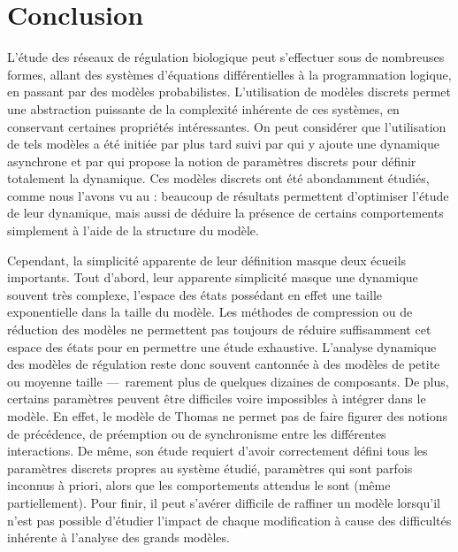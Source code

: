 
\chapter{Conclusion}




L'étude des réseaux de régulation biologique peut s'effectuer sous de nombreuses formes,
allant des systèmes d'équations différentielles à la programmation logique,
en passant par des modèles probabilistes.
L'utilisation de modèles discrets permet une abstraction puissante de la complexité inhérente
de ces systèmes, en conservant certaines propriétés intéressantes.
On peut considérer que l'utilisation de tels modèles a été initiée par
 plus tard suivi par 
qui y ajoute une dynamique asynchrone
et par 
qui propose la notion de paramètres discrets pour définir totalement la dynamique.
Ces modèles discrets ont été abondamment étudiés,
comme nous l'avons vu au  :
beaucoup de résultats permettent d'optimiser l'étude de leur dynamique,
mais aussi de déduire la présence de certains comportements
simplement à l'aide de la structure du modèle.

Cependant, la simplicité apparente de leur définition masque deux écueils importants.
Tout d'abord, leur apparente simplicité masque une dynamique souvent très complexe,
l'espace des états possédant en effet une taille exponentielle dans la taille du modèle.
Les méthodes de compression ou de réduction des modèles ne permettent pas toujours
de réduire suffisamment cet espace des états pour en permettre une étude exhaustive.
L'analyse dynamique des modèles de régulation reste donc souvent cantonnée
à des modèles de petite ou moyenne taille ---~rarement plus de quelques dizaines de composants.
De plus, certains paramètres peuvent être difficiles voire impossibles à intégrer dans le modèle.
En effet, le modèle de Thomas ne permet pas de faire figurer des notions de précédence,
de préemption ou de synchronisme entre les différentes interactions.
De même, son étude requiert d'avoir correctement défini tous les paramètres discrets
propres au système étudié, paramètres qui sont parfois inconnus à priori,
alors que les comportements attendus le sont (même partiellement).
Pour finir, il peut s'avérer difficile de raffiner un modèle lorsqu'il n'est pas
possible d'étudier l'impact de chaque modification
à cause des difficultés inhérente à l'analyse des grands modèles.


